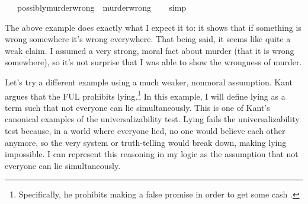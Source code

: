 \begin{isabellebody}
\ \ \ {\isachardoublequoteopen}possibly{\isacharunderscore}murder{\isacharunderscore}wrong\ {\isasymlongrightarrow}\ murder{\isacharunderscore}wrong{\isachardoublequoteclose}\isanewline
%
\isadelimproof
\ \ %
\endisadelimproof
%
\isatagproof
{}\isamarkupfalse%
\ simp\isanewline
%
%
\endisatagproof
{\isafoldproof}%
%
\isadelimproof
%
\endisadelimproof
%
\begin{isamarkuptext}%
The above example does exactly what I expect it to: it shows that if something is wrong somewhere 
it's wrong everywhere. That being said, it seems like quite a weak claim. I assumed a very strong, moral 
fact about murder (that it is wrong somewhere), so it's not surprise that I was able to show the wrongness 
of murder.%
\end{isamarkuptext}\isamarkuptrue%
%
\begin{isamarkuptext}%
Let's try a different example using a much weaker, nonmoral assumption. Kant argues that the FUL
prohibits lying.\footnote{Specifically, he prohibits making a false promise in order to get some cash \cite[idk page no]{groundwork}.}
In this example, I will define lying as a term such that not everyone can lie simultaneously. This is 
one of Kant's canonical examples of the universalizability test. Lying fails the universalizability 
test because, in a world where everyone lied, no one would believe each other anymore, so the very system 
or truth-telling would break down, making lying impossible. I can represent this reasoning in my logic 
as the assumption that not everyone can lie simultaneously. 


\end{isamarkuptext}
\end{isabellebody}
